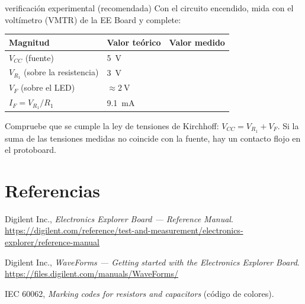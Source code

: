 \documentclass[11pt,a4paper]{article}
\begin{document}
\begin{ejemplo}{verificación experimental (recomendada)}
Con el circuito encendido, mida con el voltímetro (VMTR) de la EE Board y complete:

\vspace{4pt}
\centering
\renewcommand{\arraystretch}{1.5}
\begin{tabular}{|>{\centering\arraybackslash}m{4.6cm}|>{\centering\arraybackslash}m{2.6cm}
                |>{\centering\arraybackslash}m{2.6cm}|}
\hline
\textbf{Magnitud} & \textbf{Valor teórico} & \textbf{Valor medido}\\
\hline
$V_{CC}$ (fuente)                    & \qty{5}{\volt}          & \\
\hline
$V_{R_1}$ (sobre la resistencia)     & \qty{3}{\volt}          & \\
\hline
$V_F$ (sobre el LED)                 & $\approx\qty{2}{\volt}$ & \\
\hline
$I_F = V_{R_1}/R_1$                  & \qty{9.1}{\milli\ampere}& \\
\hline
\end{tabular}
\renewcommand{\arraystretch}{1}

\vspace{6pt}
\raggedright
Compruebe que se cumple la ley de tensiones de Kirchhoff: $V_{CC}=V_{R_1}+V_F$. Si la suma de
las tensiones medidas no coincide con la fuente, hay un contacto flojo en el protoboard.
\end{ejemplo}

\FloatBarrier
\section*{Referencias}
\begin{enumerate}[label={[\arabic*]}]
    \item Digilent Inc., \emph{Electronics Explorer Board --- Reference Manual}.
          \url{https://digilent.com/reference/test-and-measurement/electronics-explorer/reference-manual}
    \item Digilent Inc., \emph{WaveForms --- Getting started with the Electronics Explorer Board}.
          \url{https://files.digilent.com/manuals/WaveForms/}
    \item IEC 60062, \emph{Marking codes for resistors and capacitors} (código de colores).
\end{enumerate}
\end{document}
